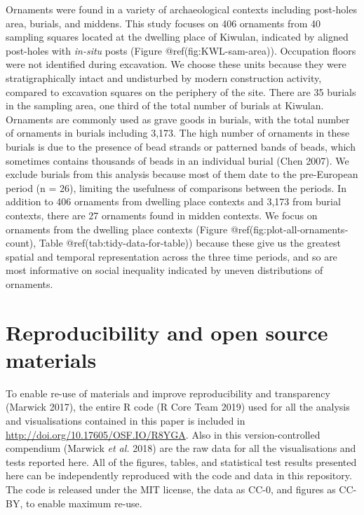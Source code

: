 \documentclass[]{article}
\begin{document}
Ornaments were found in a variety of archaeological contexts including
post-holes area, burials, and middens. This study focuses on 406
ornaments from 40 sampling squares located at the dwelling place of
Kiwulan, indicated by aligned post-holes with \emph{in-situ} posts
(Figure @ref(fig:KWL-sam-area)). Occupation floors were not identified
during excavation. We choose these units because they were
stratigraphically intact and undisturbed by modern construction
activity, compared to excavation squares on the periphery of the site.
There are 35 burials in the sampling area, one third of the total number
of burials at Kiwulan. Ornaments are commonly used as grave goods in
burials, with the total number of ornaments in burials including 3,173.
The high number of ornaments in these burials is due to the presence of
bead strands or patterned bands of beads, which sometimes contains
thousands of beads in an individual burial (Chen 2007). We exclude
burials from this analysis because most of them date to the pre-European
period (n = 26), limiting the usefulness of comparisons between the
periods. In addition to 406 ornaments from dwelling place contexts and
3,173 from burial contexts, there are 27 ornaments found in midden
contexts. We focus on ornaments from the dwelling place contexts (Figure
@ref(fig:plot-all-ornaments-count), Table @ref(tab:tidy-data-for-table))
because these give us the greatest spatial and temporal representation
across the three time periods, and so are most informative on social
inequality indicated by uneven distributions of ornaments.

\hypertarget{reproducibility-and-open-source-materials}{%
\section{Reproducibility and open source
materials}\label{reproducibility-and-open-source-materials}}

To enable re-use of materials and improve reproducibility and
transparency (Marwick 2017), the entire R code (R Core Team 2019) used
for all the analysis and visualisations contained in this paper is
included in \url{http://doi.org/10.17605/OSF.IO/R8YGA}. Also in this
version-controlled compendium (Marwick \emph{et al.} 2018) are the raw
data for all the visualisations and tests reported here. All of the
figures, tables, and statistical test results presented here can be
independently reproduced with the code and data in this repository. The
code is released under the MIT license, the data as CC-0, and figures as
CC-BY, to enable maximum re-use.
\end{document}
